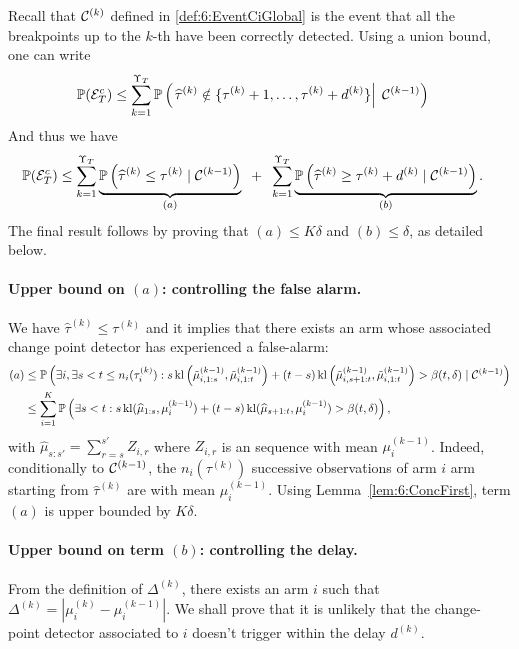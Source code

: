 Recall that $\mathcal{C}^{(k)}$ defined in \eqref{def:6:EventCiGlobal} is the event that all the breakpoints up to the $k$-th have been correctly detected.
Using a union bound, one can write
%
\begin{align*}
    \mathbb{P}(\mathcal{E}_T^c) & \leq \sum\limits_{k=1}^{\Upsilon_T}
    \mathbb{P}\left(\left. \widehat{\tau}^{(k)} \notin \{ \tau^{(k)}+1, \dots, \tau^{(k)} + d^{(k)} \} \right|\; \mathcal{C}^{(k-1)}\right)
\end{align*}
And thus we have
\begin{align*}
    \mathbb{P}(\mathcal{E}_T^c) & \leq \sum\limits_{k=1}^{\Upsilon_T} \underbrace{\mathbb{P}\left(\widehat{\tau}^{(k)} \leq \tau^{(k)} \;|\; \mathcal{C}^{(k-1)}\right)}_{(a)} \;\; + \;\; \sum\limits_{k=1}^{\Upsilon_T} \underbrace{\mathbb{P}\left(\widehat{\tau}^{(k)} \geq \tau^{(k)} + d^{(k)} \;|\; \mathcal{C}^{(k-1)}\right)}_{(b)}.
\end{align*}
%
The final result follows by proving that $(a) \leq K \delta$ and $(b)\leq \delta$, as detailed below.


\paragraph{Upper bound on $(a)$: controlling the false alarm.}
%
We have $\widehat{\tau}^{(k)} \leq \tau^{(k)}$ and it implies that there exists an arm whose associated change point detector has experienced a false-alarm:
%
\begin{align*}
    (a) & \leq \mathbb{P}\left(\exists i, \exists s < t \leq n_i(\tau_i^{(k)}) : s \, \mathrm{kl}\left(\tilde{\mu}_{i,1:s}^{(k-1)},\tilde{\mu}_{i,1:t}^{(k-1)}\right) + (t - s) \, \mathrm{kl}\left(\tilde{\mu}_{i,s+1:t}^{(k-1)},\tilde{\mu}_{i,1:t}^{(k-1)}\right) > \beta(t, \delta) \;|\; \mathcal{C}^{(k-1)}\right) \\
    & \leq \sum_{i=1}^K\mathbb{P}\left(\exists s < t : s \, \mathrm{kl}(\widehat{\mu}_{1:s},\mu_i^{(k-1)}) + (t - s) \, \mathrm{kl}(\widehat{\mu}_{s+1:t}, \mu_{i}^{(k-1)}) > \beta(t, \delta)\right),
\end{align*}
with $\hat\mu_{s:s'} = \sum_{r=s}^{s'} Z_{i,r}$ where $Z_{i,r}$ is an \iid{} sequence with mean $\mu_i^{(k-1)}$.
Indeed, conditionally to $\mathcal{C}^{(k-1)}$, the $n_i(\tau^{(k)})$ successive observations of arm $i$ arm starting from $\hat \tau^{(k)}$ are \iid{} with mean $\mu_i^{(k-1)}$.
Using Lemma~\ref{lem:6:ConcFirst}, term $(a)$ is upper bounded by $K\delta$.


\paragraph{Upper bound on term $(b)$: controlling the delay.}
\label{par:6:controllingDelayInOneProof}
%
From the definition of $\Delta^{(k)}$, there exists an arm $i$ such that $\Delta^{(k)} = |\mu_i^{(k)} - \mu_i^{(k-1)}|$. We shall prove that it is unlikely that the change-point detector associated to $i$ doesn't trigger within the delay $d^{(k)}$.

